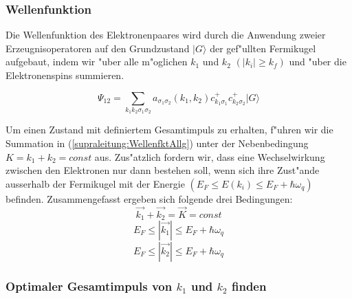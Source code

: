 \begin{refsection}
\subsubsection{Wellenfunktion}
Die Wellenfunktion des Elektronenpaares wird durch die Anwendung zweier Erzeugnisoperatoren auf den Grundzustand $|G\rangle$ der gef"ullten Fermikugel aufgebaut, indem wir "uber alle m"oglichen $k_1$ und $k_2$ $(|k_i| \ge k_f)$ und "uber die Elektronenspins summieren.

\begin{equation}
\Psi_{12}=\sum \limits_{k_1k_2\sigma_1\sigma_2} a_{\sigma_1\sigma_2}(k_1,k_2)c^+_{k_1\sigma_1}c^+_{k_2\sigma_2}|G\rangle
\label{supraleitung:WellenfktAllg}
\end{equation}

Um einen Zustand mit definiertem Gesamtimpuls zu erhalten, f"uhren wir die Summation in (\ref{supraleitung:WellenfktAllg}) unter der Nebenbedingung $K=k_1+k_2=const$ aus. Zus"atzlich fordern wir, dass eine Wechselwirkung zwischen den Elektronen nur dann bestehen soll, wenn sich ihre Zust"ande ausserhalb der Fermikugel mit der Energie $(E_F \le E(k_i) \le E_F+\hbar\omega_q)$ befinden.
Zusammengefasst ergeben sich folgende drei Bedingungen:
\[
\overrightarrow{k_1}+\overrightarrow{k_2}=\overrightarrow{K}=const
\]
\[
E_F\le|\overrightarrow{k_1}|\le E_F+\hbar\omega_q
\]
\[
E_F\le|\overrightarrow{k_2}|\le E_F+\hbar\omega_q
\]
\subsubsection{Optimaler Gesamtimpuls von $k_1$ und $k_2$ finden}


\end{refsection}

